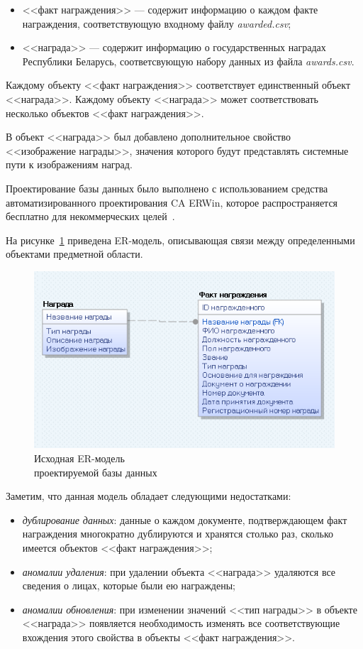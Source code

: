 \begin{itemize}
  \item <<факт награждения>> --- содержит информацию о каждом факте награждения,
    соответствующую входному файлу \textit{awarded.csv};
  \item <<награда>> --- содержит информацию о государственных наградах
    Республики Беларусь, соответсвующую набору данных из файла \textit{awards.csv}.
\end{itemize}

Каждому объекту <<факт награждения>> соответствует единственный
объект <<награда>>.
Каждому объекту <<награда>> может соответствовать несколько объектов
<<факт награждения>>.

В объект <<награда>> был добавлено дополнительное свойство
<<изображение награды>>, значения которого будут представлять
системные пути к изображениям наград.

Проектирование базы данных было выполнено с использованием средства 
автоматизированного проектирования CA ERWin, которое распространяется
бесплатно для некоммерческих целей~\cite{er_win_license}.

На рисунке~\ref{fig:er_naive} приведена ER-модель, описывающая связи между 
определенными объектами предметной области.

\begin{figure}[h]
  \centering
  \includegraphics[width=130mm]{pic/er_naive.png}
  \caption{Исходная ER-модель \\ проектируемой базы данных}
  \label{fig:er_naive}
\end{figure}

Заметим, что данная модель обладает следующими недостатками:
\begin{itemize}
\item
  \textit{дублирование данных}: данные о каждом документе,
  подтверждающем факт награждения
  многократно дублируются и хранятся столько раз,
  сколько имеется объектов <<факт награждения>>;
\item
  \textit{аномалии удаления}: при удалении объекта <<награда>> удаляются
  все сведения о лицах, которые были ею награждены;
\item
  \textit{аномалии обновления}: при изменении значений <<тип награды>> в объекте
  <<награда>> появляется необходимость изменять все соответствующие вхождения этого свойства в
  объекты <<факт награждения>>.
\end{itemize}

